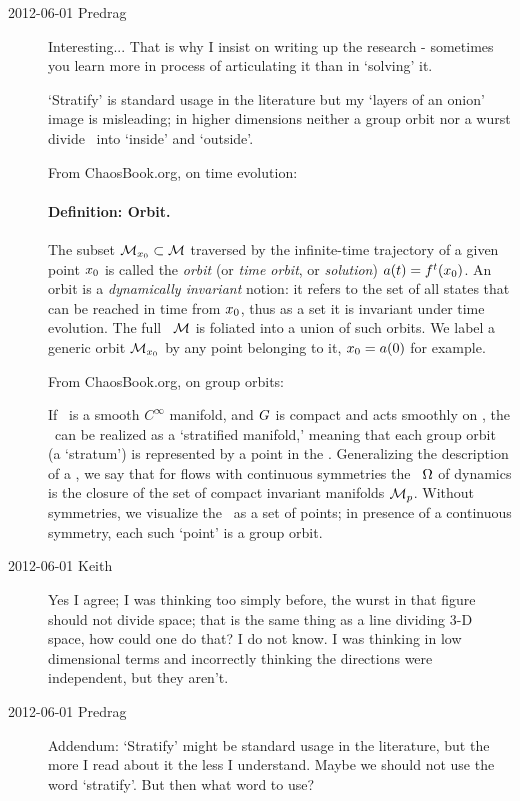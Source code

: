 \begin{description}
\item[2012-06-01 Predrag] Interesting... That is why I insist on writing up
the research - sometimes you learn more in process of articulating it than
in `solving' it.

`Stratify' is standard usage in the literature
but my `layers of an onion' image is misleading; in higher dimensions neither a group
orbit nor a wurst divide \statesp\ into `inside' and `outside'.

From ChaosBook.org, on time evolution:

\paragraph{Definition:
            Orbit.}
The subset ${\cal M}_{x_0} \subset {\cal M}$ traversed by the infinite-time
trajectory of a given point ${x_0}$ is called the \emph{orbit} (or
\emph{time orbit}, or \emph{solution}) $a(t) = {f^{t}({x_0})}$. An
orbit is a {\em dynamically invariant} notion: it refers to the set of
all states that can be reached in time from ${x_0}$, thus as a set it is
invariant under time evolution. The full \statesp\ ${\cal M}$ is foliated
into a union of such orbits. We label a generic orbit
${\cal M}_{x_0}$ by any point belonging to it, ${x_0}=a(0)$ for example.

From ChaosBook.org, on group orbits:

If \pS\ is a
smooth $C^\infty$ manifold, and $G$ is compact and acts
smoothly on \pS, the \reducedsp\ can be realized
as a `stratified manifold,' meaning that each group orbit (a
`stratum') is represented by a point in the \reducedsp.
Generalizing the description
of a \nws,
we say that for flows
with continuous symmetries the \nws\ $\Omega$ of  dynamics
is the closure of the set of compact
invariant manifolds ${\cal M}_p$. Without symmetries, we visualize
the \nws\ as a set of points; in presence of a continuous symmetry,
each such `point' is a group orbit.

\item[2012-06-01 Keith] Yes I agree; I was thinking too simply before, the wurst in that figure should not divide space; that is the same thing as a line dividing 3-D space, how could one do that?  I do not know. I was thinking in low dimensional terms and incorrectly thinking the directions were independent, but they aren't.

\item[2012-06-01 Predrag] Addendum:
`Stratify' might be standard usage in the literature, but the more I read
about it the less I understand. Maybe we should not use the word `stratify'.
But then what word to use?


\end{description}
